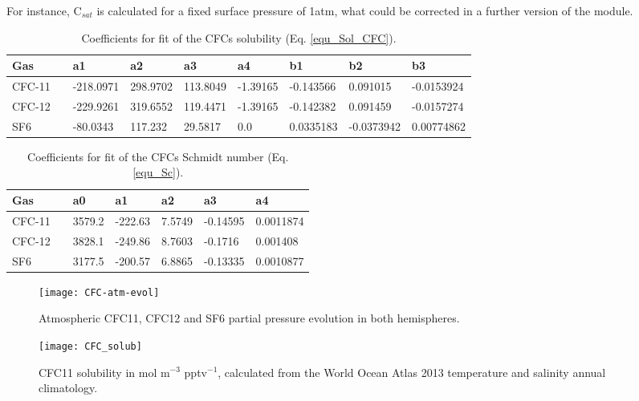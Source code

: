 \documentclass[../main/TOP_manual]{subfiles}
\begin{document}

For instance, C$_{sat}$ is calculated for a fixed surface pressure of 1atm, what could be corrected in a further version of the module.


\begin{table}[!t]
\caption{Coefficients for fit of the CFCs solubility (Eq. \ref{equ_Sol_CFC}).}
\vskip4mm
\centering
\begin{tabular}{l l l l l l l l l}
\hline
Gas   & & a1 & a2 & a3 & a4 & b1 & b2 & b3 \\
\hline
CFC-11 & & -218.0971 & 298.9702 & 113.8049 & -1.39165 & -0.143566  & 0.091015   & -0.0153924 \\
CFC-12 & & -229.9261 & 319.6552 & 119.4471 & -1.39165 & -0.142382  & 0.091459   & -0.0157274 \\
SF6    & & -80.0343  & 117.232  & 29.5817  & 0.0      & 0.0335183  & -0.0373942 & 0.00774862 \\
\hline
\end{tabular}
\label{tab_ref_CFC}
\end{table}


\begin{table}[!t]
\caption{Coefficients for fit of the CFCs Schmidt number (Eq. \ref{equ_Sc}). }
\vskip4mm
\centering
\begin{tabular}{l l l l l l l }
\hline
Gas  & & a0 & a1 & a2 & a3 & a4 \\
\hline
CFC-11 & & 3579.2  & -222.63 & 7.5749 & -0.14595 & 0.0011874   \\
CFC-12 & & 3828.1  & -249.86 & 8.7603 & -0.1716  & 0.001408    \\
SF6    & & 3177.5  & -200.57 & 6.8865 & -0.13335 & 0.0010877   \\
\hline
\end{tabular}
\label{tab_Sc}
\end{table}



\begin{figure}[!h]
\centering
\texttt{[image: CFC-atm-evol]}
  \caption{Atmospheric CFC11, CFC12 and SF6 partial pressure evolution in both hemispheres.}
\label{img_cfcatm}
\end{figure}

\begin{figure}[!h]
\centering
\texttt{[image: CFC\_solub]}
  \caption{CFC11 solubility in mol m$^{-3}$ pptv$^{-1}$, calculated from the World Ocean Atlas 2013 temperature and salinity annual climatology.}
\label{img_cfcsol}
\end{figure}
\end{document}
